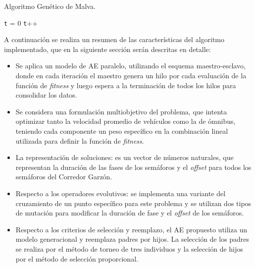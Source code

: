 \begin{algorithm}[H]
	\caption{Algoritmo Genético de Malva. }
	\label{alg:algoritmo_genetico_malva}
	\begin{algorithmic} [1] 
		{
			\STATE \texttt{t} = 0
			\STATE \texttt{t}++		
			\ENDWHILE
		}
	\end{algorithmic}
	
\end{algorithm}

A continuación se realiza un resumen de las características del algoritmo implementado, que en la siguiente sección serán descritas en detalle:
\begin{itemize}
	
	\item Se aplica un modelo de AE paralelo, utilizando el esquema maestro-esclavo, donde en cada iteración el maestro genera un hilo por cada evaluación de la función de \emph{fitness} y luego espera a la terminación de todos los hilos para consolidar los datos. 
	\item Se considera una formulación multiobjetivo del problema, que intenta optimizar tanto la velocidad promedio de vehículos como la de ómnibus, teniendo cada componente un peso específico en la combinación lineal utilizada para definir la función de \emph{fitness}.
	\item La representación de soluciones: es un vector de números naturales, que representan la duración de las fases de los semáforos y el \emph{offset} para todos los semáforos del Corredor Garzón.
	\item Respecto a los operadores evolutivos: se implementa una variante del cruzamiento de un punto específico para este problema y se utilizan dos tipos de mutación para modificar la duración de fase y el \emph{offset} de los semáforos.
	\item Respecto a los criterios de selección y reemplazo, el AE propuesto utiliza un modelo generacional y reemplaza padres por hijos. La selección de los padres se realiza por el método de torneo de tres individuos y la selección de hijos por el método de selección proporcional.
	
\end{itemize}

